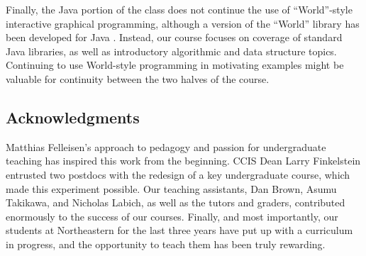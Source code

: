 \documentclass[submission,copyright]{eptcs}
\begin{document}
Finally, the Java portion of the class does not continue the use of
``World''-style interactive graphical programming, although a version
of the ``World'' library has been developed for Java
\cite{local:java-world}.  Instead, our course focuses on coverage of
standard Java libraries, as well as introductory algorithmic and data
structure topics.  Continuing to use World-style programming in
motivating examples might be valuable for continuity between the two
halves of the course.

\subsection*{Acknowledgments}

Matthias Felleisen's approach to pedagogy and passion for
undergraduate teaching has inspired this work from the beginning.
CCIS Dean Larry Finkelstein entrusted two postdocs with the redesign
of a key undergraduate course, which made this experiment possible.
Our teaching assistants, Dan Brown, Asumu Takikawa, and Nicholas
Labich, as well as the tutors and graders, contributed enormously to
the success of our courses. Finally, and most importantly, our
students at Northeastern for the last three years have put up with a
curriculum in progress, and the opportunity to teach them has been
truly rewarding.



\end{document}
